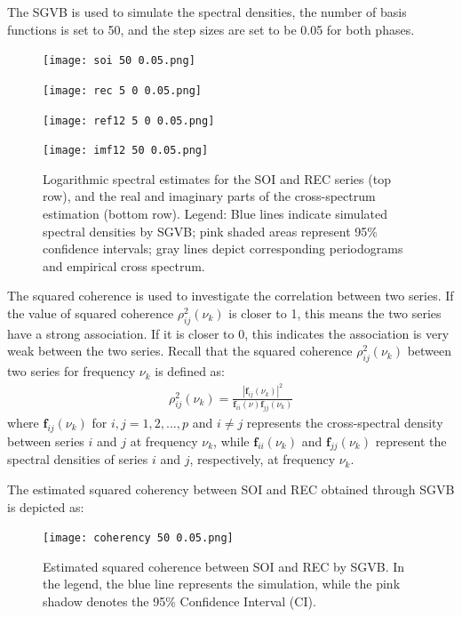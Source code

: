 \documentclass[12pt,a4paper]{article}
\begin{document}
The SGVB is used to simulate the spectral densities, the number of basis functions is set to 50, and the step
sizes are set to be 0.05 for both phases.
\begin{figure}[h]
\begin{minipage}[b]{0.45\linewidth}
\centering
\texttt{[image: soi 50 0.05.png]}
\end{minipage}
\begin{minipage}[b]{0.45\linewidth}
\centering
\texttt{[image: rec 5 0 0.05.png]}
\end{minipage}

\begin{minipage}[b]{0.45\linewidth}
\centering
\texttt{[image: ref12 5 0 0.05.png]}
\end{minipage}
\begin{minipage}[b]{0.45\linewidth}
\centering
\texttt{[image: imf12 50 0.05.png]}
\end{minipage}
\caption{Logarithmic spectral estimates for the SOI and REC series (top row), and the real and imaginary parts of the cross-spectrum estimation (bottom row). Legend: Blue lines indicate simulated spectral densities by SGVB; pink shaded areas represent 95\% confidence intervals; gray lines depict corresponding periodograms and empirical cross spectrum.}
\label{soi}
\end{figure}

The squared coherence is used to investigate the correlation between two series. If the value of squared coherence $\rho_{ij}^2(\nu_k)$ is closer to 1, this means the two series have a strong association. If it is closer to 0, this indicates the association is very weak between the two series. Recall that the squared coherence $\rho_{ij}^2(\nu_k)$ between two series for frequency $\nu_k$ is defined as:
\begin{align}
\rho_{ij}^2(\nu_k) = \frac{|\bm{f}_{ij}(\nu_k)|^2}{\bm{f}_{ii}(\nu)\bm{f}_{jj}(\nu_k)}
\end{align}
where $\bm{f}_{ij}(\nu_k)$ for $i,j = 1,2,...,p$ and $i\neq j$ represents the cross-spectral density between series $i$ and $j$ at frequency $\nu_k$, while $\bm{f}_{ii}(\nu_k)$ and $\bm{f}_{jj}(\nu_k)$ represent the spectral densities of series $i$ and $j$, respectively, at frequency $\nu_k$.

The estimated squared coherency between SOI and REC obtained through SGVB is depicted as:
\begin{figure}[H]
\centering
\texttt{[image: coherency 50 0.05.png]}
\caption{Estimated squared coherence between SOI and REC by SGVB. In the legend, the blue line represents the simulation, while the pink shadow denotes the 95\% Confidence Interval (CI).}
\label{coherency 50 0.05}
\end{figure}
\end{document}
